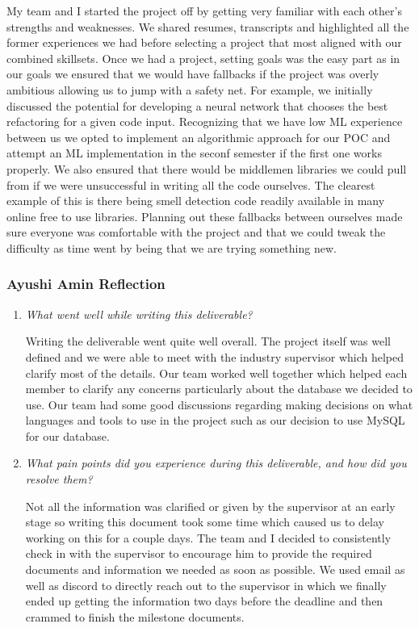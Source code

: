 \documentclass{article}
\begin{document}
\begin{enumerate}
    My team and I started the project off by getting very familiar
    with each other’s strengths and weaknesses. We shared resumes,
    transcripts and highlighted all the former experiences we had
    before selecting a project that most aligned with our combined
    skillsets. Once we had a project, setting goals was the easy part
    as in our goals we ensured that we would have fallbacks if the
    project was overly ambitious allowing us to jump with a safety
    net. For example, we initially discussed the potential for
    developing a neural network that chooses the best refactoring for
    a given code input. Recognizing that we have low ML experience
    between us we opted to implement an algorithmic approach for our
    POC and attempt an ML implementation in the seconf semester if
    the first one works properly. We also ensured that there would be
    middlemen libraries we could pull from if we were unsuccessful in
    writing all the code ourselves. The clearest example of this is
    there being smell detection code readily available in many online
    free to use libraries. Planning out these fallbacks between
    ourselves made sure everyone was comfortable with the project and
    that we could tweak the difficulty as time went by being that we
    are trying something new.

\end{enumerate}

\subsubsection*{Ayushi Amin Reflection}

\begin{enumerate}
  \item \textit{What went well while writing this deliverable?}

    Writing the deliverable went quite well overall. The project
    itself was well defined and we were able to meet with the
    industry supervisor which helped clarify most of the details. Our
    team worked well together which helped each member to clarify any
    concerns particularly about the database we decided to use. Our
    team had some good discussions regarding making decisions on
    what languages and tools to use in the project such as our
    decision to use MySQL for our database.

  \item \textit{What pain points did you experience during this
    deliverable, and how did you resolve them?}

    Not all the information was clarified or given by the supervisor
    at an early stage so writing this document took some time which
    caused us to delay working on this for a couple days. The team
    and I decided to consistently check in with the supervisor to
    encourage him to provide the required documents and information
    we needed as soon as possible. We used email as well as discord
    to directly reach out to the supervisor in which we finally ended
    up getting the information two days before the deadline and then
    crammed to finish the milestone documents.

\end{enumerate}
\end{document}
